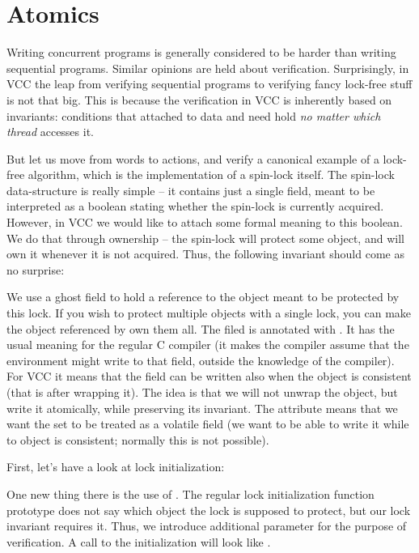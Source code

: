 \section{Atomics}
\label{sect:concurrency}

Writing concurrent programs is generally considered to be harder than writing
sequential programs.
Similar opinions are held about verification.
Surprisingly, in VCC the leap from verifying sequential programs to
verifying fancy lock-free stuff is not that big.
This is because the verification in VCC is inherently based on invariants:
conditions that attached to data and need hold \emph{no matter which thread}
accesses it.

But let us move from words to actions, and verify a canonical example
of a lock-free algorithm, which is the implementation of a spin-lock itself.
The spin-lock data-structure is really simple -- it contains just a single
field, meant to be interpreted as a boolean stating whether the spin-lock
is currently acquired.
However, in VCC we would like to attach some formal meaning to this boolean.
We do that through ownership -- the spin-lock will protect some object,
and will own it whenever it is not acquired.
Thus, the following invariant should come as no surprise:


\noindent
We use a ghost field to hold a reference to the object meant to be protected
by this lock.
If you wish to protect multiple objects with a single lock, you can make
the object referenced by  own them all.
The  filed is annotated with .
It has the usual meaning for the regular C compiler (\ie it makes the compiler
assume that the environment might write to that field, outside the knowledge
of the compiler).
For VCC it means that the field can be written also when the object is
consistent (that is after wrapping it).
The idea is that we will not unwrap the object, but write it atomically,
while preserving its invariant.
The attribute
 means that we want the \vcc{\owns} set
to be treated as a volatile field (\ie we want to be able to write
it while to object is consistent; normally this is not possible).

First, let's have a look at lock initialization:


\noindent
One new thing there is the use of .
The regular lock initialization function prototype does not say which
object the lock is supposed to protect, but our lock invariant requires it.
Thus, we introduce additional parameter for the purpose of verification.
A call to the initialization will look like .

